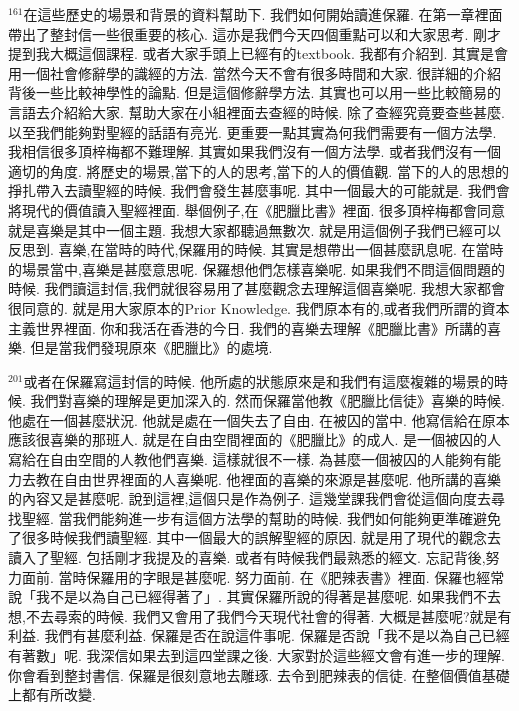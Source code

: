 \documentclass{book}
\begin{document}
$^{161}$在這些歷史的場景和背景的資料幫助下.
我們如何開始讀進保羅.
在第一章裡面帶出了整封信一些很重要的核心.
這亦是我們今天四個重點可以和大家思考.
剛才提到我大概這個課程.
或者大家手頭上已經有的textbook.
我都有介紹到.
其實是會用一個社會修辭學的識經的方法.
當然今天不會有很多時間和大家.
很詳細的介紹背後一些比較神學性的論點.
但是這個修辭學方法.
其實也可以用一些比較簡易的言語去介紹給大家.
幫助大家在小組裡面去查經的時候.
除了查經究竟要查些甚麼.
以至我們能夠對聖經的話語有亮光.
更重要一點其實為何我們需要有一個方法學.
我相信很多頂梓梅都不難理解.
其實如果我們沒有一個方法學.
或者我們沒有一個適切的角度.
將歷史的場景,當下的人的思考,當下的人的價值觀.
當下的人的思想的掙扎帶入去讀聖經的時候.
我們會發生甚麼事呢.
其中一個最大的可能就是.
我們會將現代的價值讀入聖經裡面.
舉個例子,在《肥臘比書》裡面.
很多頂梓梅都會同意就是喜樂是其中一個主題.
我想大家都聽過無數次.
就是用這個例子我們已經可以反思到.
喜樂,在當時的時代,保羅用的時候.
其實是想帶出一個甚麼訊息呢.
在當時的場景當中,喜樂是甚麼意思呢.
保羅想他們怎樣喜樂呢.
如果我們不問這個問題的時候.
我們讀這封信,我們就很容易用了甚麼觀念去理解這個喜樂呢.
我想大家都會很同意的.
就是用大家原本的Prior Knowledge.
我們原本有的,或者我們所謂的資本主義世界裡面.
你和我活在香港的今日.
我們的喜樂去理解《肥臘比書》所講的喜樂.
但是當我們發現原來《肥臘比》的處境.

$^{201}$或者在保羅寫這封信的時候.
他所處的狀態原來是和我們有這麼複雜的場景的時候.
我們對喜樂的理解是更加深入的.
然而保羅當他教《肥臘比信徒》喜樂的時候.
他處在一個甚麼狀況.
他就是處在一個失去了自由.
在被囚的當中.
他寫信給在原本應該很喜樂的那班人.
就是在自由空間裡面的《肥臘比》的成人.
是一個被囚的人寫給在自由空間的人教他們喜樂.
這樣就很不一樣.
為甚麼一個被囚的人能夠有能力去教在自由世界裡面的人喜樂呢.
他裡面的喜樂的來源是甚麼呢.
他所講的喜樂的內容又是甚麼呢.
說到這裡,這個只是作為例子.
這幾堂課我們會從這個向度去尋找聖經.
當我們能夠進一步有這個方法學的幫助的時候.
我們如何能夠更準確避免了很多時候我們讀聖經.
其中一個最大的誤解聖經的原因.
就是用了現代的觀念去讀入了聖經.
包括剛才我提及的喜樂.
或者有時候我們最熟悉的經文.
忘記背後,努力面前.
當時保羅用的字眼是甚麼呢.
努力面前.
在《肥辣表書》裡面.
保羅也經常說「我不是以為自己已經得著了」.
其實保羅所說的得著是甚麼呢.
如果我們不去想,不去尋索的時候.
我們又會用了我們今天現代社會的得著.
大概是甚麼呢?就是有利益.
我們有甚麼利益.
保羅是否在說這件事呢.
保羅是否說「我不是以為自己已經有著數」呢.
我深信如果去到這四堂課之後.
大家對於這些經文會有進一步的理解.
你會看到整封書信.
保羅是很刻意地去雕琢.
去令到肥辣表的信徒.
在整個價值基礎上都有所改變.
\end{document}
